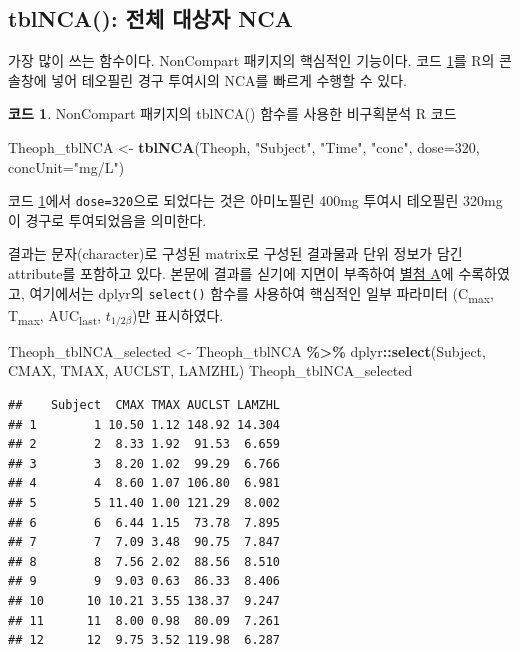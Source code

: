 \documentclass[
  11pt,
  krantz2, a4paper, twoside]{krantz}
\newenvironment{Shaded}{\begin{snugshade}}{\end{snugshade}}
\newcommand{\AttributeTok}[1]{\textcolor[rgb]{0.13,0.29,0.53}{#1}}
\newcommand{\DecValTok}[1]{\textcolor[rgb]{0.00,0.00,0.81}{#1}}
\newcommand{\FunctionTok}[1]{\textcolor[rgb]{0.13,0.29,0.53}{\textbf{#1}}}
\newcommand{\NormalTok}[1]{#1}
\newcommand{\OtherTok}[1]{\textcolor[rgb]{0.56,0.35,0.01}{#1}}
\newcommand{\SpecialCharTok}[1]{\textcolor[rgb]{0.81,0.36,0.00}{\textbf{#1}}}
\newcommand{\StringTok}[1]{\textcolor[rgb]{0.31,0.60,0.02}{#1}}
\theoremstyle{definition}
\theoremstyle{definition}
\newtheorem{example}{코드}[chapter]
\theoremstyle{definition}
\theoremstyle{definition}
\theoremstyle{remark}
\begin{document}
\subsection{tblNCA(): 전체 대상자 NCA}\label{tblNCA}

가장 많이 쓰는 함수이다.
NonCompart 패키지의 핵심적인 기능이다.
코드 \ref{exm:tblnca-code}를 R의 콘솔창에 넣어 테오필린 경구 투여시의 NCA를 빠르게 수행할 수 있다.

\begin{example}
\protect\hypertarget{exm:tblnca-code}{}\label{exm:tblnca-code}NonCompart 패키지의 tblNCA() 함수를 사용한 비구획분석 R 코드
\end{example}

\vspace{-5ex}

\begin{Shaded}
\begin{Highlighting}[]
\NormalTok{Theoph\_tblNCA }\OtherTok{\textless{}{-}} \FunctionTok{tblNCA}\NormalTok{(Theoph, }\StringTok{"Subject"}\NormalTok{, }\StringTok{"Time"}\NormalTok{, }\StringTok{"conc"}\NormalTok{, }
                        \AttributeTok{dose=}\DecValTok{320}\NormalTok{, }\AttributeTok{concUnit=}\StringTok{"mg/L"}\NormalTok{)}
\end{Highlighting}
\end{Shaded}

코드 \ref{exm:tblnca-code}에서 \texttt{dose=320}으로 되었다는 것은 아미노필린 400mg 투여시 테오필린 320mg이 경구로 투여되었음을 의미한다.

결과는 문자(character)로 구성된 matrix로 구성된 결과물과 단위 정보가 담긴 attribute를 포함하고 있다.
본문에 결과를 싣기에 지면이 부족하여 \hyperref[Theoph_tblNCA]{별첨 A}에 수록하였고, 여기에서는 dplyr의 \texttt{select()} 함수를 사용하여 핵심적인 일부 파라미터 (C\textsubscript{max}, T\textsubscript{max}, AUC\textsubscript{last}, \(t_{1/2\beta}\))만 표시하였다.

\begin{Shaded}
\begin{Highlighting}[]
\NormalTok{Theoph\_tblNCA\_selected }\OtherTok{\textless{}{-}}\NormalTok{ Theoph\_tblNCA }\SpecialCharTok{\%\textgreater{}\%} 
\NormalTok{  dplyr}\SpecialCharTok{::}\FunctionTok{select}\NormalTok{(Subject, CMAX, TMAX, AUCLST, LAMZHL)}
\NormalTok{Theoph\_tblNCA\_selected}
\end{Highlighting}
\end{Shaded}

\begin{verbatim}
##    Subject  CMAX TMAX AUCLST LAMZHL
## 1        1 10.50 1.12 148.92 14.304
## 2        2  8.33 1.92  91.53  6.659
## 3        3  8.20 1.02  99.29  6.766
## 4        4  8.60 1.07 106.80  6.981
## 5        5 11.40 1.00 121.29  8.002
## 6        6  6.44 1.15  73.78  7.895
## 7        7  7.09 3.48  90.75  7.847
## 8        8  7.56 2.02  88.56  8.510
## 9        9  9.03 0.63  86.33  8.406
## 10      10 10.21 3.55 138.37  9.247
## 11      11  8.00 0.98  80.09  7.261
## 12      12  9.75 3.52 119.98  6.287
\end{verbatim}
\end{document}
